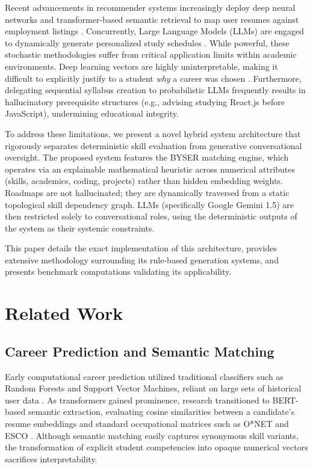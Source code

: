 \documentclass[conference]{IEEEtran}
\begin{document}
Recent advancements in recommender systems increasingly deploy deep neural networks and transformer-based semantic retrieval to map user resumes against employment listings \cite{semantic1}. Concurrently, Large Language Models (LLMs) are engaged to dynamically generate personalized study schedules \cite{llm1}. While powerful, these stochastic methodologies suffer from critical application limits within academic environments. Deep learning vectors are highly uninterpretable, making it difficult to explicitly justify to a student \textit{why} a career was chosen \cite{xai1}. Furthermore, delegating sequential syllabus creation to probabilistic LLMs frequently results in hallucinatory prerequisite structures (e.g., advising studying React.js before JavaScript), undermining educational integrity.

To address these limitations, we present a novel hybrid system architecture that rigorously separates deterministic skill evaluation from generative conversational oversight. The proposed system features the BYSER matching engine, which operates via an explainable mathematical heuristic across numerical attributes (skills, academics, coding, projects) rather than hidden embedding weights. Roadmaps are not hallucinated; they are dynamically traversed from a static topological skill dependency graph. LLMs (specifically Google Gemini 1.5) are then restricted solely to conversational roles, using the deterministic outputs of the system as their systemic constraints. 

This paper details the exact implementation of this architecture, provides extensive methodology surrounding its rule-based generation systems, and presents benchmark computations validating its applicability. 

\section{Related Work}

\subsection{Career Prediction and Semantic Matching}
Early computational career prediction utilized traditional classifiers such as Random Forests and Support Vector Machines, reliant on large sets of historical user data \cite{prior1}. As transformers gained prominence, research transitioned to BERT-based semantic extraction, evaluating cosine similarities between a candidate's resume embeddings and standard occupational matrices such as O*NET and ESCO \cite{semantic1, esco1}. Although semantic matching easily captures synonymous skill variants, the transformation of explicit student competencies into opaque numerical vectors sacrifices interpretability. 
\end{document}
